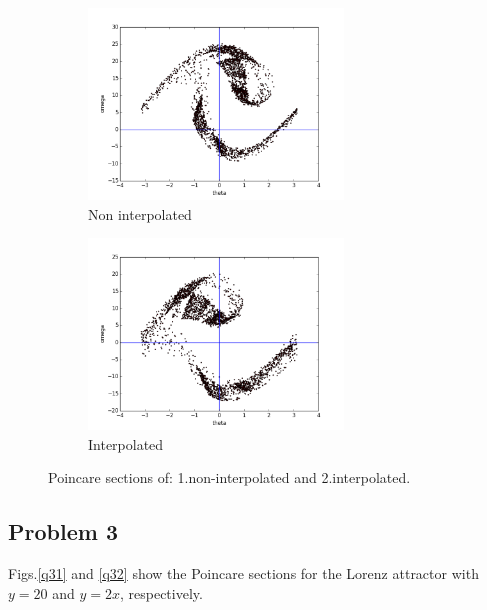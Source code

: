 \documentclass{article}
\begin{document}
\begin{figure}[h]
\centering
\begin{subfigure}{.5\textwidth}
  \centering
  \includegraphics[height=2in]{figs/q2/non_interpolation.png}
  \caption{Non interpolated}
  \label{q21}
\end{subfigure}%
\begin{subfigure}{.5\textwidth}
  \centering
  \includegraphics[height=2in]{figs/q2/interpolation.png}
  \caption{Interpolated}
  \label{q22}
\end{subfigure}
\caption{Poincare sections of: 1.non-interpolated and 2.interpolated.}
\label{q2}
\end{figure}

\subsection*{Problem 3}
Figs.\ref{q31} and \ref{q32} show the Poincare sections for the Lorenz attractor with $y = 20$ and $y =2x$, respectively.
\end{document}
